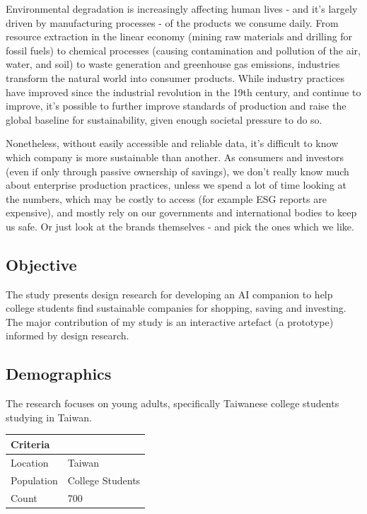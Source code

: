 \documentclass[
  12pt,
  letterpaper,
  DIV=11,
  numbers=noendperiod]{scrartcl}
\begin{document}
Environmental degradation is increasingly affecting human lives - and
it's largely driven by manufacturing processes - of the products we
consume daily. From resource extraction in the linear economy (mining
raw materials and drilling for fossil fuels) to chemical processes
(causing contamination and pollution of the air, water, and soil) to
waste generation and greenhouse gas emissions, industries transform the
natural world into consumer products. While industry practices have
improved since the industrial revolution in the 19th century, and
continue to improve, it's possible to further improve standards of
production and raise the global baseline for sustainability, given
enough societal pressure to do so.

Nonetheless, without easily accessible and reliable data, it's difficult
to know which company is more sustainable than another. As consumers and
investors (even if only through passive ownership of savings), we don't
really know much about enterprise production practices, unless we spend
a lot of time looking at the numbers, which may be costly to access (for
example ESG reports are expensive), and mostly rely on our governments
and international bodies to keep us safe. Or just look at the brands
themselves - and pick the ones which we like.

\subsection{Objective}\label{objective}

The study presents design research for developing an AI companion to
help college students find sustainable companies for shopping, saving
and investing. The major contribution of my study is an interactive
artefact (a prototype) informed by design research.

\subsection{Demographics}\label{demographics}

The research focuses on young adults, specifically Taiwanese college
students studying in Taiwan.

\begin{longtable}[]{@{}ll@{}}
\toprule\noalign{}
Criteria & \\
\midrule\noalign{}
\endhead
\bottomrule\noalign{}
\endlastfoot
Location & Taiwan \\
Population & College Students \\
Count & 700 \\
\end{longtable}
\end{document}
